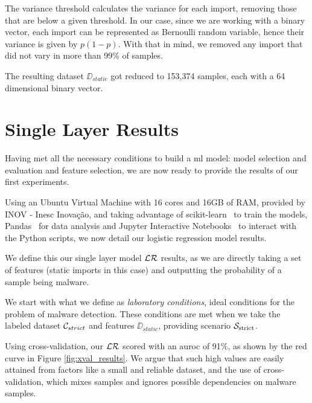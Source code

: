 The variance threshold calculates the variance for each import, removing those that are below a given threshold.
In our case, since we are working with a binary vector, each import can be represented as Bernoulli random variable, hence their variance is given by $p(1-p)$.
With that in mind, we removed any import that did not vary in more than 99\% of samples.

The resulting dataset $\DD_{static}$ got reduced to 153,374 samples, each with a 64 dimensional binary vector.

\section{Single Layer Results}
\label{section:single_layer_results}

Having met all the necessary conditions to build a \gls{ml} model: model selection and evaluation and feature selection, we are now ready to provide the results of our first experiments.

Using an Ubuntu Virtual Machine with 16 cores and 16GB of RAM, provided by INOV - Inesc Inovação, and taking advantage of scikit-learn~\cite{tool:sklearn} to train the models, Pandas~\cite{tool:pandas} for data analysis and Jupyter Interactive Notebooks~\cite{tool:jupyter} to interact with the Python scripts, we now detail our logistic regression model results.

We define this our single layer model $\mathcal{LR}$ results, as we are directly taking a set of features (static imports in this case) and outputting the probability of a sample being malware.

\medskip

We start with what we define as \textit{laboratory conditions}, ideal conditions for the problem of malware detection.
These conditions are met when we take the labeled dataset $\mathcal{C}_{strict}$ and features $\DD_{static}$, providing scenario $\mathcal{S}_{\mathrm{strict}}$.

Using cross-validation, our $\mathcal{LR}$ scored with an \gls{auroc} of 91\%, as shown by the red curve in Figure \ref{fig:xval_results}.
We argue that such high values are easily attained from factors like a small and reliable dataset, and the use of cross-validation, which mixes samples and ignores possible dependencies on malware samples.

